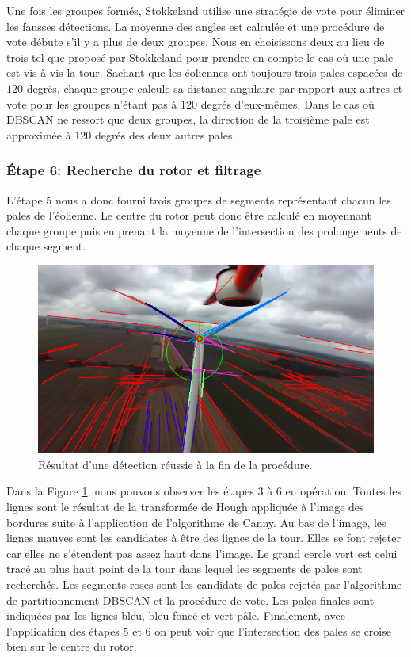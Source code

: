 Une fois les groupes formés, Stokkeland utilise une stratégie de vote pour éliminer les fausses détections. La moyenne des angles est calculée et une procédure de vote débute s'il y a plus de deux groupes. Nous en choisissons deux au lieu de trois tel que proposé par Stokkeland pour prendre en compte le cas où une pale est vis-à-vis la tour. Sachant que les éoliennes ont toujours trois pales espacées de $120$ degrés, chaque groupe calcule sa distance angulaire par rapport aux autres et vote pour les groupes n'étant pas à $120$ degrés d’eux-mêmes. Dans le cas où DBSCAN ne ressort que deux groupes, la direction de la troisième pale est approximée à 120 degrés des deux autres pales.

\subsubsection{Étape 6: Recherche du rotor et filtrage}

L'étape 5 nous a donc fourni trois groupes de segments représentant chacun les pales de l'éolienne. Le centre du rotor peut donc être calculé en moyennant chaque groupe puis en prenant la moyenne de l'intersection des prolongements de chaque segment.

\begin{figure}[htb]
  \centering
  \includegraphics[width=0.8\linewidth]{images/turbine_detect_result.png}
  \caption{Résultat d'une détection réussie à la fin de la procédure.}
  \label{fig:detect_result_step6}
\end{figure}

Dans la Figure \ref{fig:detect_result_step6}, nous pouvons observer les étapes $3$ à $6$ en opération. Toutes les lignes sont le résultat de la transformée de Hough appliquée à l'image des bordures suite à l'application de l'algorithme de Canny. Au bas de l'image, les lignes mauves sont les candidates à être des lignes de la tour. Elles se font rejeter car elles ne s'étendent pas assez haut dans l'image. Le grand cercle vert est celui tracé au plus haut point de la tour dans lequel les segments de pales sont recherchés. Les segments roses sont les candidats de pales rejetés par l'algorithme de partitionnement DBSCAN et la procédure de vote.
Les pales finales sont indiquées par les lignes bleu, bleu foncé et vert pâle. Finalement, avec l'application des étapes $5$ et $6$ on peut voir que l'intersection des pales se croise bien sur le centre du rotor.

